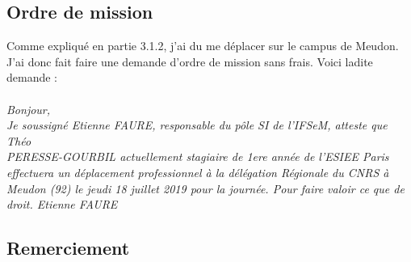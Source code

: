 \subsection{Ordre de mission}
Comme expliqué en partie 3.1.2, j'ai du me déplacer sur le campus de Meudon. J'ai donc fait faire une demande d'ordre de mission sans frais. Voici ladite demande :
\\
\\
\textit{
Bonjour,\\
Je soussigné Etienne FAURE, responsable du pôle SI de l’IFSeM, atteste que Théo \\PERESSE-GOURBIL actuellement stagiaire de 1ere année de l’ESIEE Paris effectuera un déplacement professionnel à la délégation Régionale du CNRS à Meudon (92) le jeudi 18 juillet 2019 pour la journée.
\medbreak
Pour faire valoir ce que de droit.
\smallbreak
Etienne FAURE}
\subsection{Remerciement}